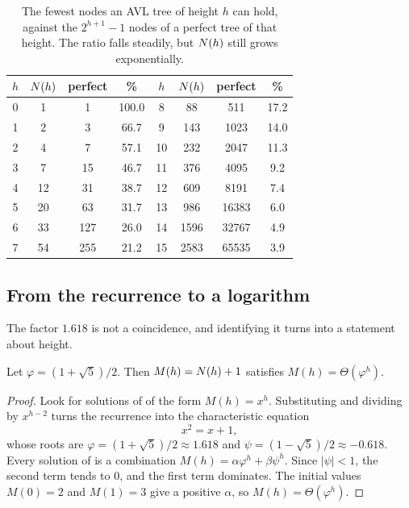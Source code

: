 \begin{table}[t]
  \centering
  \caption{The fewest nodes an AVL tree of height $h$ can hold, against the
  $2^{h+1}-1$ nodes of a perfect tree of that height. The ratio falls steadily,
  but $\Nmin(h)$ still grows exponentially.}
  \label{tab:nh}
  \begin{tabular}{@{}S[table-format=2.0]S[table-format=4.0]S[table-format=5.0]S[table-format=3.1]@{\qquad\qquad}S[table-format=2.0]S[table-format=4.0]S[table-format=5.0]S[table-format=2.1]@{}}
    \toprule
    {$h$} & {$\Nmin(h)$} & {perfect} & {\%} &
    {$h$} & {$\Nmin(h)$} & {perfect} & {\%} \\
     &    1 &     1 & 100.0 &  8 &   88 &   511 & 17.2 \\
    1 &    2 &     3 &  66.7 &  9 &  143 &  1023 & 14.0 \\
    2 &    4 &     7 &  57.1 & 10 &  232 &  2047 & 11.3 \\
    3 &    7 &    15 &  46.7 & 11 &  376 &  4095 &  9.2 \\
    4 &   12 &    31 &  38.7 & 12 &  609 &  8191 &  7.4 \\
    5 &   20 &    63 &  31.7 & 13 &  986 & 16383 &  6.0 \\
    6 &   33 &   127 &  26.0 & 14 & 1596 & 32767 &  4.9 \\
    7 &   54 &   255 &  21.2 & 15 & 2583 & 65535 &  3.9 \\
    \bottomrule
  \end{tabular}
\end{table}

\subsection{From the recurrence to a logarithm}

The factor $1.618$ is not a coincidence, and identifying it turns
 into a statement about height.

\begin{lemma}
\label{lem:growth}
Let $\varphi = (1+\sqrt{5})/2$. Then $M(h) = N(h) + 1$ satisfies $M(h) =
\Theta(\varphi^{h})$.
\end{lemma}

\begin{proof}
Look for solutions of  of the form $M(h) = x^{h}$. Substituting and
dividing by $x^{h-2}$ turns the recurrence into the characteristic equation
\begin{equation}
  \label{eq:char}
  x^{2} = x + 1 ,
\end{equation}
whose roots are $\varphi = (1+\sqrt{5})/2 \approx 1.618$ and $\psi =
(1-\sqrt{5})/2 \approx -0.618$. Every solution of  is a
combination $M(h) = \alpha\varphi^{h} + \beta\psi^{h}$. Since $|\psi| < 1$, the
second term tends to $0$, and the first term dominates. The initial values
$M(0) = 2$ and $M(1) = 3$ give a positive $\alpha$, so $M(h) =
\Theta(\varphi^{h})$.
\end{proof}

